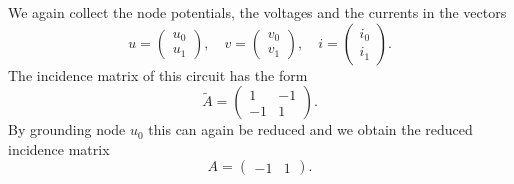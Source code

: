 \begin{example2}[LC-Circuit]
	We again collect the node potentials, the voltages and the currents in the vectors
	\begin{displaymath}
		u=
		\left(
		\begin{matrix}
			u_0 \\
			u_1
		\end{matrix}
		\right),
		\quad
		v=
		\left(
		\begin{matrix}
			v_0 \\
			v_1
		\end{matrix}
		\right),
		\quad
		i=
		\left(
		\begin{matrix}
			i_0 \\
			i_1
		\end{matrix}
		\right).
	\end{displaymath}
	The incidence matrix of this circuit has the form
	\begin{displaymath}
		\tilde{A} = 
		\left(
		\begin{matrix}
			1 & -1  \\
			-1 & 1 
		\end{matrix}
		\right).
	\end{displaymath}
	By grounding node $u_0$ this can again be reduced and we obtain the reduced incidence matrix
	\begin{displaymath}
		A = 
		\left(
		\begin{matrix}
			-1 & 1  
		\end{matrix}
		\right).
	\end{displaymath}
\end{example2}

